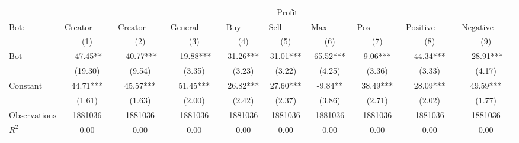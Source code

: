 \begin{tabular}{lccccccccc}
\hline
 & \multicolumn{9}{c}{$\text{Profit}$} \\
 $\text{Bot}:$ & $\text{Creator Launch Bundle}$ & $\text{Creator Buy Bundle}$ & $\text{General Launch Bundle}$ & $\text{Buy Bundle}$ & $\text{Sell Bundle}$ & $\text{Max Same Txn}$ & $\text{Pos-\#Swaps Ratio}$ & $\text{Positive Comment Bot}$ & $\text{Negative Comment Bot}$ \\
 & (1) & (2) & (3) & (4) & (5) & (6) & (7) & (8) & (9)\\
\hline
$\text{Bot}$ & -47.45** & -40.77*** & -19.88*** & 31.26*** & 31.01*** & 65.52*** & 9.06*** & 44.34*** & -28.91*** \\
 & (19.30) & (9.54) & (3.35) & (3.23) & (3.22) & (4.25) & (3.36) & (3.33) & (4.17) \\
$\text{Constant}$ & 44.71*** & 45.57*** & 51.45*** & 26.82*** & 27.60*** & -9.84** & 38.49*** & 28.09*** & 49.59*** \\
 & (1.61) & (1.63) & (2.00) & (2.42) & (2.37) & (3.86) & (2.71) & (2.02) & (1.77) \\
$\text{Observations}$ & 1881036 & 1881036 & 1881036 & 1881036 & 1881036 & 1881036 & 1881036 & 1881036 & 1881036 \\
$R^2$ & 0.00 & 0.00 & 0.00 & 0.00 & 0.00 & 0.00 & 0.00 & 0.00 & 0.00 \\
\hline
\end{tabular}